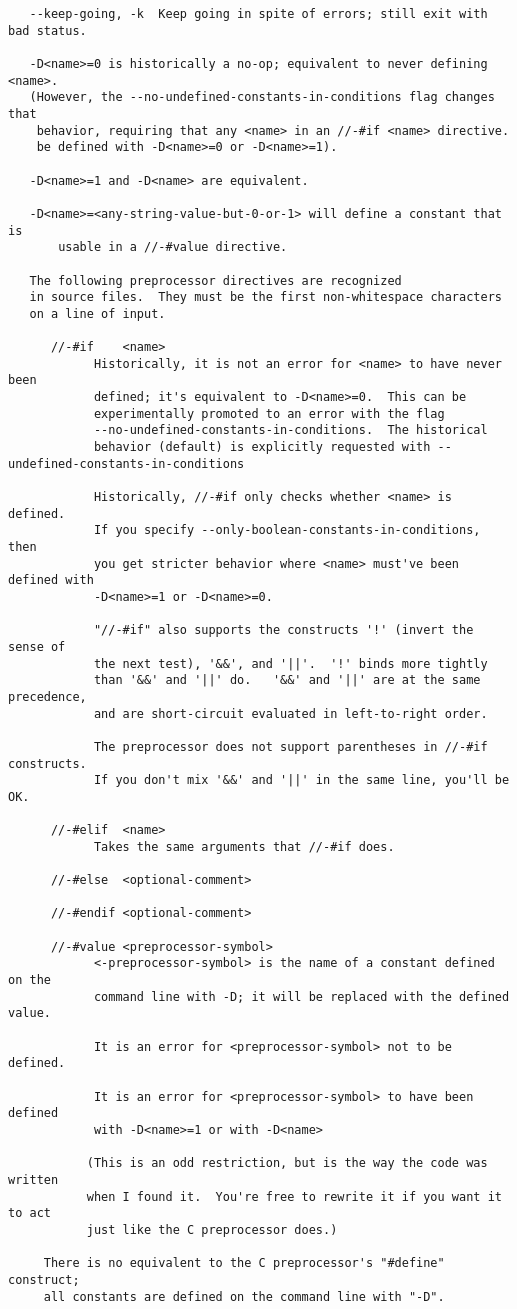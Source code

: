 \begin{verbatim}
   --keep-going, -k  Keep going in spite of errors; still exit with bad status.

   -D<name>=0 is historically a no-op; equivalent to never defining <name>.
   (However, the --no-undefined-constants-in-conditions flag changes that
    behavior, requiring that any <name> in an //-#if <name> directive.
    be defined with -D<name>=0 or -D<name>=1).

   -D<name>=1 and -D<name> are equivalent.

   -D<name>=<any-string-value-but-0-or-1> will define a constant that is
       usable in a //-#value directive.

   The following preprocessor directives are recognized
   in source files.  They must be the first non-whitespace characters
   on a line of input.

      //-#if    <name>
            Historically, it is not an error for <name> to have never been
            defined; it's equivalent to -D<name>=0.  This can be 
            experimentally promoted to an error with the flag
            --no-undefined-constants-in-conditions.  The historical
            behavior (default) is explicitly requested with --undefined-constants-in-conditions
            
            Historically, //-#if only checks whether <name> is defined.
            If you specify --only-boolean-constants-in-conditions, then
            you get stricter behavior where <name> must've been defined with
            -D<name>=1 or -D<name>=0.

            "//-#if" also supports the constructs '!' (invert the sense of 
            the next test), '&&', and '||'.  '!' binds more tightly 
            than '&&' and '||' do.   '&&' and '||' are at the same precedence,
            and are short-circuit evaluated in left-to-right order.

            The preprocessor does not support parentheses in //-#if constructs.
            If you don't mix '&&' and '||' in the same line, you'll be OK.

      //-#elif  <name>
            Takes the same arguments that //-#if does. 

      //-#else  <optional-comment>

      //-#endif <optional-comment>

      //-#value <preprocessor-symbol>
            <-preprocessor-symbol> is the name of a constant defined on the
            command line with -D; it will be replaced with the defined value.

            It is an error for <preprocessor-symbol> not to be defined.

            It is an error for <preprocessor-symbol> to have been defined
            with -D<name>=1 or with -D<name>

           (This is an odd restriction, but is the way the code was written
           when I found it.  You're free to rewrite it if you want it to act
           just like the C preprocessor does.)

     There is no equivalent to the C preprocessor's "#define" construct;
     all constants are defined on the command line with "-D".
\end{verbatim}

